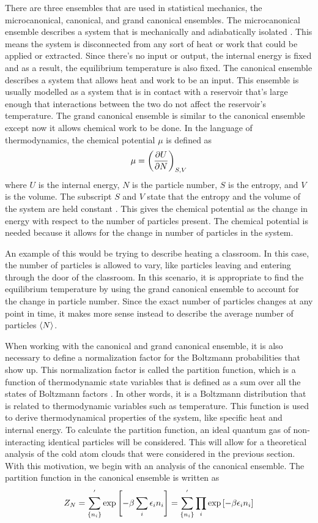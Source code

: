 There are three ensembles that are used in statistical mechanics, the microcanonical, canonical, and grand canonical ensembles. The microcanonical ensemble describes a system that is mechanically and adiabatically isolated \cite{Kardar}. This means the system is disconnected from any sort of heat or work that could be applied or extracted. Since there's no input or output, the internal energy is fixed and as a result, the equilibrium temperature is also fixed. 
The canonical ensemble describes a system that allows heat and work to be an input. This ensemble is usually modelled as a system that is in contact with a reservoir that's large enough  that interactions between the two do not affect the reservoir's temperature. 
The grand canonical ensemble is similar to the canonical ensemble except now it allows chemical work to be done. In the language of thermodynamics, the chemical potential $\mu$ is defined as 
\begin{equation*}
    \mu=\qty(\frac{\partial U}{\partial N})_{S,V}
\end{equation*}
where $U$ is the internal energy, $N$ is the particle number, $S$ is the entropy, and $V$ is the volume. The subscript $S$ and $V$ state that the entropy and the volume of the system are held constant \cite{Blundell}. This gives the chemical potential as the change in energy with respect to the number of particles present. The chemical potential is needed because it allows for the change in number of particles in the system. 

An example of this would be trying to describe heating a classroom. In this case, the number of particles is allowed to vary, like particles leaving and entering through the door of the classroom. In this scenario, it is appropriate to find the equilibrium temperature by using the grand canonical ensemble to account for the change in particle number. Since the exact number of particles changes at any point in time, it makes more sense instead to describe the average number of particles $\left<{N}\right>$. 

When working with the canonical and grand canonical ensemble, it is also necessary to 
define a normalization factor for the Boltzmann probabilities that show up. This normalization factor is called the partition function, which is a function of thermodynamic state variables that is defined as a sum over all the states of Boltzmann factors \cite{Blundell}. In other words, it is a Boltzmann distribution that is related to thermodynamic variables such as temperature. This function is used to derive thermodynamical properties of the system, like specific heat and internal energy. 
To calculate the partition function, an ideal quantum gas of non-interacting identical particles will be considered. This will allow for a theoretical analysis of the cold atom clouds that were considered in the previous section. With this motivation, we begin with an analysis of the canonical ensemble. The partition function in the canonical ensemble is written as
\begin{equation}
    Z_N=\sum_{\{n_i\}}^{'} \exp\qty[-\beta\sum_{i} \epsilon_i n_i]=\sum_{\{n_i\}}^{'} \prod_i \exp\qty[-\beta\epsilon_i n_i]
\end{equation}

